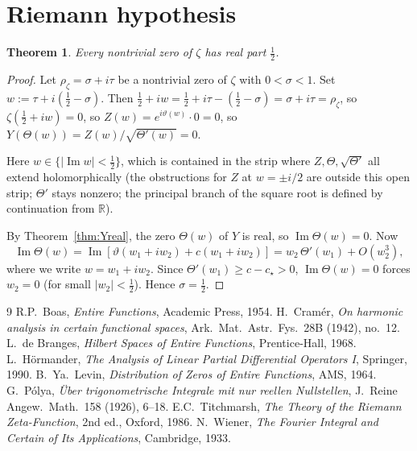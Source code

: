 \documentclass[11pt]{article}
\newtheorem{theorem}{Theorem}
\theoremstyle{definition}
\theoremstyle{remark}
\newcommand{\R}{\mathbb{R}}
\DeclareMathOperator{\Imag}{Im}
\begin{document}
\section{Riemann hypothesis}

\begin{theorem}\label{thm:RH}
Every nontrivial zero of $\zeta$ has real part $\tfrac12$.
\end{theorem}

\begin{proof}
Let $\rho_\zeta = \sigma + i\tau$ be a nontrivial zero of $\zeta$ with $0 < \sigma < 1$. Set $w := \tau + i(\tfrac12 - \sigma)$. Then $\tfrac12 + iw = \tfrac12 + i\tau - (\tfrac12 - \sigma) = \sigma + i\tau = \rho_\zeta$, so $\zeta(\tfrac12 + iw) = 0$, so $Z(w) = e^{i\vartheta(w)}\cdot 0 = 0$, so $Y(\Theta(w)) = Z(w)/\sqrt{\Theta'(w)} = 0$.

Here $w \in \{|\Imag w| < \tfrac12\}$, which is contained in the strip where $Z, \Theta, \sqrt{\Theta'}$ all extend holomorphically (the obstructions for $Z$ at $w = \pm i/2$ are outside this open strip; $\Theta'$ stays nonzero; the principal branch of the square root is defined by continuation from $\R$).

By Theorem~\ref{thm:Yreal}, the zero $\Theta(w)$ of $Y$ is real, so $\Imag\Theta(w) = 0$. Now
\[
\Imag\Theta(w) = \Imag[\vartheta(w_1 + iw_2) + c(w_1 + iw_2)] = w_2\,\Theta'(w_1) + O(w_2^3),
\]
where we write $w = w_1 + iw_2$. Since $\Theta'(w_1) \geq c - c_\star > 0$, $\Imag\Theta(w) = 0$ forces $w_2 = 0$ (for small $|w_2| < \tfrac12$). Hence $\sigma = \tfrac12$.
\end{proof}

\begin{thebibliography}{9}
 R.P.\ Boas, \emph{Entire Functions}, Academic Press, 1954.
 H.\ Cram\'er, \emph{On harmonic analysis in certain functional spaces}, Ark.\ Mat.\ Astr.\ Fys.\ 28B (1942), no.\ 12.
 L.\ de Branges, \emph{Hilbert Spaces of Entire Functions}, Prentice-Hall, 1968.
 L.\ H\"ormander, \emph{The Analysis of Linear Partial Differential Operators I}, Springer, 1990.
 B.\ Ya.\ Levin, \emph{Distribution of Zeros of Entire Functions}, AMS, 1964.
 G.\ P\'olya, \emph{\"Uber trigonometrische Integrale mit nur reellen Nullstellen}, J.\ Reine Angew.\ Math.\ 158 (1926), 6--18.
 E.C.\ Titchmarsh, \emph{The Theory of the Riemann Zeta-Function}, 2nd ed., Oxford, 1986.
 N.\ Wiener, \emph{The Fourier Integral and Certain of Its Applications}, Cambridge, 1933.
\end{thebibliography}
\end{document}
